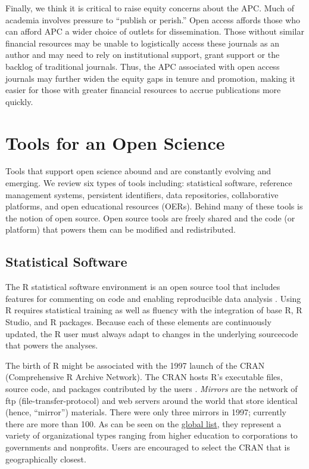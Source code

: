 \documentclass[
  11pt,
]{book}
\begin{document}
Finally, we think it is critical to raise equity concerns about the APC. Much of academia involves pressure to ``publish or perish.'' Open access affords those who can afford APC a wider choice of outlets for dissemination. Those without similar financial resources may be unable to logistically access these journals as an author and may need to rely on institutional support, grant support or the backlog of traditional journals. Thus, the APC associated with open access journals may further widen the equity gaps in tenure and promotion, making it easier for those with greater financial resources to accrue publications more quickly.

\hypertarget{tools-for-an-open-science}{%
\section{Tools for an Open Science}\label{tools-for-an-open-science}}

Tools that support open science abound and are constantly evolving and emerging. We review six types of tools including: statistical software, reference management systems, persistent identifiers, data repositories, collaborative platforms, and open educational resources (OERs). Behind many of these tools is the notion of open source. Open source tools are freely shared and the code (or platform) that powers them can be modified and redistributed.

\hypertarget{statistical-software}{%
\subsection{Statistical Software}\label{statistical-software}}

The R statistical software environment is an open source tool that includes features for commenting on code and enabling reproducible data analysis \citep{alter_responsible_2018, bezjak_open_2018}. Using R requires statistical training as well as fluency with the integration of base R, R Studio, and R packages. Because each of these elements are continuously updated, the R user must always adapt to changes in the underlying sourcecode that powers the analyses.

The birth of R might be associated with the 1997 launch of the CRAN (Comprehensive R Archive Network). The CRAN hosts R's executable files, source code, and packages contributed by the users \citep{noauthor_r_2022}. \emph{Mirrors} are the network of ftp (file-transfer-protocol) and web servers around the world that store identical (hence, ``mirror'') materials. There were only three mirrors in 1997; currently there are more than 100. As can be seen on the \href{https://cran.r-project.org/}{global list}, they represent a variety of organizational types ranging from higher education to corporations to governments and nonprofits. Users are encouraged to select the CRAN that is geographically closest.
\end{document}
